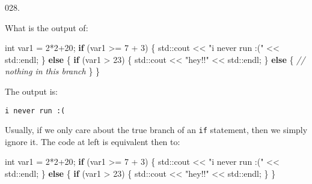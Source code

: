 \documentclass[]{book}
\newenvironment{Shaded}{}{}
\newcommand{\BuiltInTok}[1]{#1}
\newcommand{\CommentTok}[1]{\textcolor[rgb]{0.38,0.63,0.69}{\textit{#1}}}
\newcommand{\ControlFlowTok}[1]{\textcolor[rgb]{0.00,0.44,0.13}{\textbf{#1}}}
\newcommand{\DataTypeTok}[1]{\textcolor[rgb]{0.56,0.13,0.00}{#1}}
\newcommand{\DecValTok}[1]{\textcolor[rgb]{0.25,0.63,0.44}{#1}}
\newcommand{\NormalTok}[1]{#1}
\newcommand{\StringTok}[1]{\textcolor[rgb]{0.25,0.44,0.63}{#1}}
\begin{document}
\begin{minipage}{\linewidth}\noindent
{\tiny 028.}\\
\begin{minipage}[t]{.485\linewidth}

What is the output of:

\begin{framed}

\begin{Shaded}
\begin{Highlighting}[]
\DataTypeTok{int}\NormalTok{ var1 = }\DecValTok{2}\NormalTok{*}\DecValTok{2+20}\NormalTok{;}
\ControlFlowTok{if}\NormalTok{ (var1 >= }\DecValTok{7}\NormalTok{ + }\DecValTok{3}\NormalTok{) \{}
  \BuiltInTok{std::}\NormalTok{cout << }\StringTok{"i never run :("}\NormalTok{ << }\BuiltInTok{std::}\NormalTok{endl;}
\NormalTok{\} }\ControlFlowTok{else}\NormalTok{ \{}
  \ControlFlowTok{if}\NormalTok{ (var1 > }\DecValTok{23}\NormalTok{) \{}
    \BuiltInTok{std::}\NormalTok{cout << }\StringTok{"hey!!"}\NormalTok{ << }\BuiltInTok{std::}\NormalTok{endl;}
\NormalTok{  \} }\ControlFlowTok{else}\NormalTok{ \{}
    \CommentTok{// nothing in this branch}
\NormalTok{  \}}
\NormalTok{\}}
\end{Highlighting}
\end{Shaded}

\end{framed}

\end{minipage}
\hfill
\begin{minipage}[t]{.485\linewidth}

The output is:

\begin{framed}

\begin{verbatim}
i never run :(
\end{verbatim}

\end{framed}

Usually, if we only care about the true branch of an \texttt{if}
statement, then we simply ignore it. The code at left is equivalent then
to:

\begin{framed}

\begin{Shaded}
\begin{Highlighting}[]
\DataTypeTok{int}\NormalTok{ var1 = }\DecValTok{2}\NormalTok{*}\DecValTok{2+20}\NormalTok{;}
\ControlFlowTok{if}\NormalTok{ (var1 >= }\DecValTok{7}\NormalTok{ + }\DecValTok{3}\NormalTok{) \{}
  \BuiltInTok{std::}\NormalTok{cout << }\StringTok{"i never run :("}\NormalTok{ << }\BuiltInTok{std::}\NormalTok{endl;}
\NormalTok{\} }\ControlFlowTok{else}\NormalTok{ \{}
  \ControlFlowTok{if}\NormalTok{ (var1 > }\DecValTok{23}\NormalTok{) \{}
    \BuiltInTok{std::}\NormalTok{cout << }\StringTok{"hey!!"}\NormalTok{ << }\BuiltInTok{std::}\NormalTok{endl;}
\NormalTok{  \}}
\NormalTok{\}}
\end{Highlighting}
\end{Shaded}


\end{framed}
\end{minipage}
\end{minipage}
\end{document}
